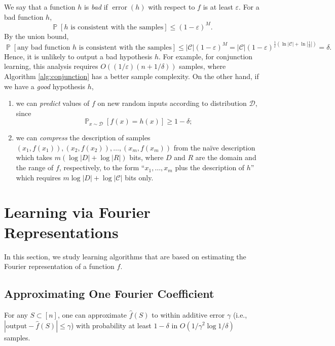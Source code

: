 \documentclass[letterpaper, reqno,11pt]{article}
\newcommand{\PP}{\mathop{{}\mathbb{P}}}
\DeclareMathOperator{\error}{error}
\begin{document}
We say that a function $h$ is \emph{bad} if $\error(h)$ with respect to $f$ is at least $\varepsilon$. For a bad function $h$,
$$ \PP[\text{$h$ is consistent with the samples}] \leq (1 - \varepsilon)^M. $$
By the union bound,
$$ \PP[\text{any bad function $h$ is consistent with the samples}] \leq |\mathcal C| (1 - \varepsilon)^M = |\mathcal C| (1 - \varepsilon)^{\frac{1}{\varepsilon}\left(\ln |\mathcal C| + \ln \left|\frac{1}{\delta}\right|\right)} = \delta. $$
Hence, it is unlikely to output a bad hypothesis $h$. For example, for conjunction learning, this analysis requires $O((1/\varepsilon)(n + 1/\delta))$ samples, where Algorithm \ref{alg:conjunction} has a better sample complexity. On the other hand, if we have a \emph{good} hypothesis $h$,
\begin{enumerate}[label=(\roman*), itemsep=0pt]
  \item we can \emph{predict} values of $f$ on new random inputs according to distribution $\mathcal D$, since
  $$ \PP_{x \sim \mathcal D}[f(x) = h(x)] \geq 1 - \delta; $$
  \item we can \emph{compress} the description of samples $(x_1, f(x_1)), (x_2, f(x_2)), \ldots, (x_m, f(x_m))$ from the na\"ive description which takes $m(\log |D| + \log |R|)$ bits, where $D$ and $R$ are the domain and the range of $f$, respectively, to the form ``$x_1, \ldots, x_m$ plus the description of $h$'' which requires $m\log |D| + \log |\mathcal C|$ bits only.
\end{enumerate}

\section{Learning via Fourier Representations}

In this section, we study learning algorithms that are based on estimating the Fourier representation of a function $f$.

\subsection{Approximating One Fourier Coefficient}

\begin{lemma}
  For any $S \subset [n]$, one can approximate $\hat{f}(S)$ to within additive error $\gamma$ (i.e., $|\text{output} - \hat{f}(S)| \leq \gamma$) with probability at least $1 - \delta$ in $O(1/\gamma^2 \log 1/\delta)$ samples.
\end{lemma}
\end{document}
